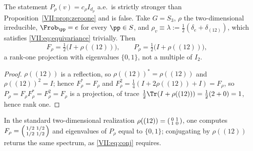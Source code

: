 \begin{proposition}\label{VII:prop:notscalar}
The statement $P_\rho(v)=c_\rho I_{d_\rho}$ a.e.\ is strictly stronger than
Proposition~\ref{VII:prop:zeroone} and is false. Take $G=S_3$, $\rho$ the two-dimensional
irreducible, $\Frob_\pp=e$ for every $\pp\in S$, and
$\rho_v\equiv\lambda:=\tfrac12(\delta_e+\delta_{(12)})$, which satisfies
\eqref{VII:eq:equivariance} trivially. Then
\[
F_\rho=\tfrac12\bigl(I+\rho((12))\bigr),\qquad
P_\rho=\tfrac12\bigl(I+\rho((12))\bigr),
\]
a rank-one projection with eigenvalues $\{0,1\}$, not a multiple of $I_2$.
\end{proposition}

\begin{proof}
$\rho((12))$ is a reflection, so $\rho((12))^*=\rho((12))$ and $\rho((12))^2=I$; hence
$F_\rho^*=F_\rho$ and $F_\rho^2=\tfrac14(I+2\rho((12))+I)=F_\rho$, so $P_\rho=F_\rho F_\rho^*=F_\rho^2=F_\rho$
is a projection, of trace $\tfrac12\Tr(I+\rho((12)))=\tfrac12(2+0)=1$, hence rank one.
\end{proof}

\begin{remark}\label{VII:rem:numscalar}
In the standard two-dimensional realization $\rho((12))=\begin{psmallmatrix}0&1\\1&0\end{psmallmatrix}$,
one computes $F_\rho=\begin{psmallmatrix}1/2&1/2\\1/2&1/2\end{psmallmatrix}$ and eigenvalues
of $P_\rho$ equal to $\{0,1\}$; conjugating by $\rho((12))$ returns the same spectrum, as
\eqref{VII:eq:conj} requires.
\end{remark}

